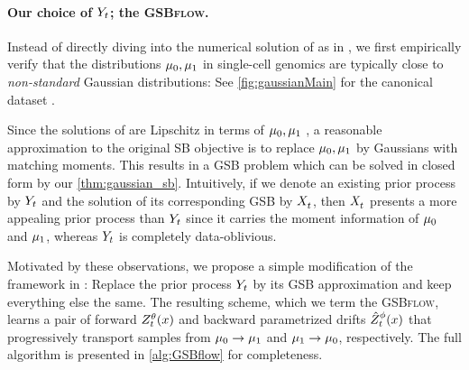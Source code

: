 \paragraph{Our choice of $Y_{ t }$; the \textsc{GSBflow}.}


Instead of directly diving into the numerical solution of  as in \citet{chen2021likelihood}, we first empirically verify that the distributions $\mu_0,\mu_1$ in single-cell genomics are typically close to \emph{non-standard} Gaussian distributions: See \cref{fig:gaussianMain} for the canonical dataset \citep{schiebinger2019optimal}. 

Since the solutions of  are Lipschitz in terms of $\mu_0,\mu_1$ \citep{carlier2022lipschitz}, a reasonable approximation to the original \acrshort{SB} objective is to replace $\mu_0,\mu_1$ by Gaussians with matching moments. This results in a \acrshort{GSB} problem which can be solved in closed form by our \cref{thm:gaussian_sb}. Intuitively, if we denote an existing prior process by $Y_{ t }$ and the solution of its corresponding \acrshort{GSB} by $X^{}_{ t }$, then $X^{}_{ t }$ presents a more appealing prior process than $Y_{ t }$ since it carries the moment information of $\mu_0$ and $\mu_1$, whereas $Y_{ t }$ is completely data-oblivious.


Motivated by these observations, we propose a simple modification of the framework in \citet{chen2021likelihood}: Replace the prior process $Y_{ t }$ by its \acrshort{GSB} approximation and keep everything else the same. The resulting scheme, which we term the \textsc{GSBflow}, learns a pair of forward {\color{pink} $\SBf$} and backward parametrized drifts {\color{blue} $\SBb$} that progressively transport samples from $\mu_0 \rightarrow \mu_1$ and $\mu_1 \rightarrow \mu_0$, respectively. The full algorithm is presented in \cref{alg:GSBflow} for completeness.



